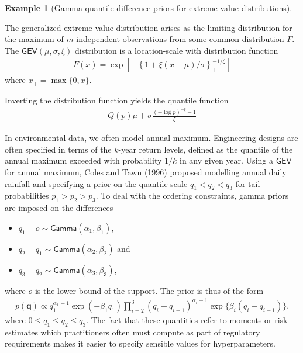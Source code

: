 \documentclass[
  11pt,
  letterpaper,
]{scrbook}
\providecommand{\tightlist}{%
  \setlength{\itemsep}{0pt}\setlength{\parskip}{0pt}}\usepackage{longtable,booktabs,array}
\theoremstyle{definition}
\newtheorem{example}{Example}[chapter]
\theoremstyle{definition}
\theoremstyle{definition}
\theoremstyle{plain}
\theoremstyle{remark}
\begin{document}
\begin{example}[Gamma quantile difference priors for extreme value
distributions]\protect\hypertarget{exm-colestawn}{}\label{exm-colestawn}

The generalized extreme value distribution arises as the limiting
distribution for the maximum of \(m\) independent observations from some
common distribution \(F\). The \(\mathsf{GEV}(\mu, \sigma, \xi)\)
distribution is a location-scale with distribution function
\begin{align*}
F(x) = \exp\left[ - \left\{1+\xi(x-\mu)/\sigma\right\}^{-1/\xi}_{+}\right]
\end{align*} where \(x_{+} = \max\{0, x\}\).

Inverting the distribution function yields the quantile function
\begin{align*}
Q(p) \mu + \sigma \frac{(-\log p)^{-\xi}-1}{\xi}
\end{align*}

In environmental data, we often model annual maximum. Engineering
designs are often specified in terms of the \(k\)-year return levels,
defined as the quantile of the annual maximum exceeded with probability
\(1/k\) in any given year. Using a \(\mathsf{GEV}\) for annual maximum,
Coles and Tawn (\protect\hyperlink{ref-Coles.Tawn:1996}{1996}) proposed
modelling annual daily rainfall and specifying a prior on the quantile
scale \(q_1 < q_2 < q_3\) for tail probabilities \(p_1> p_2 > p_3\). To
deal with the ordering constraints, gamma priors are imposed on the
differences

\begin{itemize}
\tightlist
\item
  \(q_1 - o \sim \mathsf{Gamma}(\alpha_1, \beta_1)\),
\item
  \(q_2 - q_1 \sim \mathsf{Gamma}(\alpha_2, \beta_2)\) and
\item
  \(q_3-q_2 \sim \mathsf{Gamma}(\alpha_3, \beta_3)\),
\end{itemize}

where \(o\) is the lower bound of the support. The prior is thus of the
form \begin{align*}
p(\boldsymbol{q}) \propto q_1^{\alpha_1-1}\exp(-\beta_1 q_1) \prod_{i=2}^3 (q_i-q_{i-1})^{\alpha_i-1} \exp\{\beta_i(q_i-q_{i-1})\}.
\end{align*} where \(0 \leq q_1 \leq q_2 \leq q_3\). The fact that these
quantities refer to moments or risk estimates which practitioners often
must compute as part of regulatory requirements makes it easier to
specify sensible values for hyperparameters.

\end{example}
\end{document}
